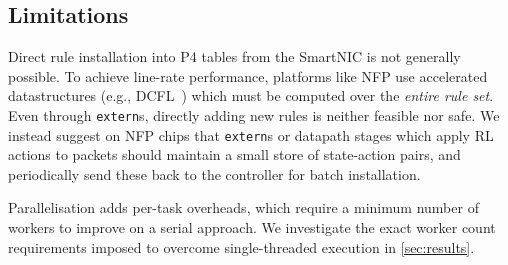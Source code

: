\documentclass[
conference
,10pt
]{IEEEtran}
\begin{document}
\subsection{Limitations}\label{sec:limitations}
Direct rule installation into P4 tables from the SmartNIC is not generally possible.
To achieve line-rate performance, platforms like NFP use accelerated datastructures (e.g., DCFL~\parencite{DBLP:conf/infocom/TaylorT05}) which must be computed over the \emph{entire rule set}.
Even through \texttt{extern}s, directly adding new rules is neither feasible nor safe.
We instead suggest on NFP chips that \texttt{extern}s or datapath stages which apply RL actions to packets should maintain a small store of state-action pairs, and periodically send these back to the controller for batch installation.

Parallelisation adds per-task overheads, which require a minimum number of workers to improve on a serial approach.
We investigate the exact worker count requirements imposed to overcome single-threaded execution in \cref{sec:results}.
\end{document}
